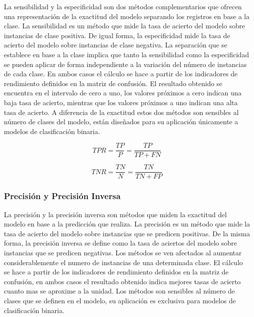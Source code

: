 La sensibilidad y la especificidad \cite{Florkowski2008}\cite{tharwat_2018} son dos métodos complementarios que ofrecen una representación de la exactitud del modelo separando los registros en base a la clase. La sensibilidad es un método que mide la tasa de acierto del modelo sobre instancias de clase positiva. De igual forma, la especificidad mide la tasa de acierto del modelo sobre instancias de clase negativa. La separación que se establece en base a la clase implica que tanto la sensibilidad como la especificidad se pueden aplicar de forma independiente a la variación del número de instancias de cada clase. En ambos casos el cálculo se hace a partir de los indicadores de rendimiento definidos en la matriz de confusión. El resultado obtenido se encuentra en el intervalo de cero a uno, los valores próximos a cero indican una baja tasa de acierto, mientras que los valores próximos a uno indican una alta tasa de acierto. A diferencia de la exactitud estos dos métodos son sensibles al número de clases del modelo, están diseñados para su aplicación únicamente a modelos de clasificación binaria.

\bigbreak

\begin{equation}
    TPR = \frac{TP}{P} = \frac{TP}{TP+FN}
    \label{eq:TPR}      
\end{equation}

\bigbreak

\begin{equation}
    TNR = \frac{TN}{N} = \frac{TN}{TN+FP}
    \label{eq:TNR}    
\end{equation}


\subsubsection{Precisión y Precisión Inversa}

La precisión y la precisión inversa \cite{tharwat_2018} son métodos que miden la exactitud del modelo en base a la predicción que realiza. La precisión es un método que mide la tasa de acierto del modelo sobre instancias que se predicen positivas. De la misma forma, la precisión inversa se define como la tasa de aciertos del modelo sobre instancias que se predicen negativas. Los métodos se ven afectados al aumentar considerablemente el numero de instancias de una determinada clase. El cálculo se hace a partir de los indicadores de rendimiento definidos en la matriz de confusión, en ambos casos el resultado obtenido indica mejores tasas de acierto cuanto mas se aproxime a la unidad. Los métodos son sensibles al número de clases que se definen en el modelo, su aplicación es exclusiva para modelos de clasificación binaria.

